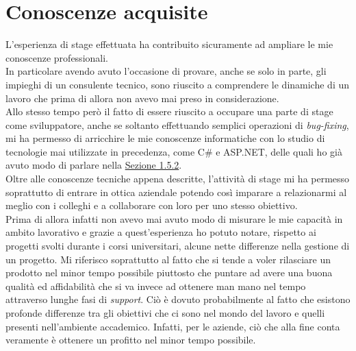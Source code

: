 \newpage
\section{Conoscenze acquisite}
L'esperienza di stage effettuata ha contribuito sicuramente ad ampliare le mie conoscenze professionali. \\
In particolare avendo avuto l'occasione di provare, anche se solo in parte, gli impieghi di un consulente tecnico, sono riuscito a comprendere le dinamiche di un lavoro che prima di allora non avevo mai preso in considerazione. \\
Allo stesso tempo però il fatto di essere riuscito a occupare una parte di stage come sviluppatore, anche se soltanto effettuando semplici operazioni di \textit{bug-fixing}, mi ha permesso di arricchire le mie conoscenze informatiche con lo studio di tecnologie mai utilizzate in precedenza, come C\# e ASP.NET, delle quali ho già avuto modo di parlare nella \hyperref[tecnologie]{Sezione 1.5.2}. \\
Oltre alle conoscenze tecniche appena descritte, l'attività di stage mi ha
permesso soprattutto di entrare in ottica aziendale potendo così imparare a relazionarmi al meglio con i colleghi e a collaborare con loro per uno stesso obiettivo. \\
Prima di allora infatti non avevo mai avuto modo di misurare le mie capacità in ambito
lavorativo e grazie a quest'esperienza ho potuto notare, rispetto ai progetti svolti durante i corsi universitari, alcune nette differenze nella gestione di un progetto. Mi riferisco soprattutto al fatto che si tende a voler rilasciare un prodotto nel minor tempo possibile piuttosto che puntare ad avere una buona qualità ed affidabilità che si va invece ad ottenere man mano nel tempo attraverso lunghe fasi di \textit{support}. Ciò è dovuto probabilmente al fatto che esistono profonde differenze tra gli obiettivi che ci sono nel mondo del lavoro e quelli presenti nell'ambiente accademico. Infatti, per le aziende, ciò che alla fine conta veramente è ottenere un profitto nel minor tempo possibile. 

